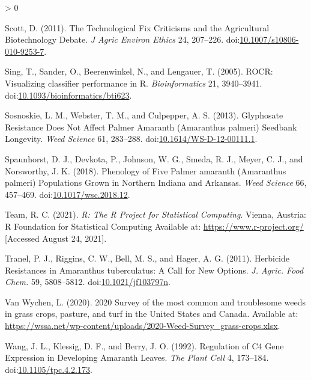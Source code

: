 \documentclass[utf8]{frontiersSCNS}
\newlength{\cslhangindent}
\newenvironment{CSLReferences}[2] %
 {%
  \setlength{\parindent}{0pt}
  \ifodd #1 \everypar{\setlength{\hangindent}{\cslhangindent}}\ignorespaces\fi
  \ifnum #2 > 0
  \setlength{\parskip}{#2\baselineskip}
  \fi
 }%
 {}
\begin{document}
\begin{CSLReferences}{1}{0}
\leavevmode\hypertarget{ref-scott2011}{}%
Scott, D. (2011). The {Technological Fix Criticisms} and the
{Agricultural Biotechnology Debate}. \emph{J Agric Environ Ethics} 24,
207--226.
doi:\href{https://doi.org/10.1007/s10806-010-9253-7}{10.1007/s10806-010-9253-7}.

\leavevmode\hypertarget{ref-sing2005}{}%
Sing, T., Sander, O., Beerenwinkel, N., and Lengauer, T. (2005). {ROCR}:
Visualizing classifier performance in {R}. \emph{Bioinformatics} 21,
3940--3941.
doi:\href{https://doi.org/10.1093/bioinformatics/bti623}{10.1093/bioinformatics/bti623}.

\leavevmode\hypertarget{ref-sosnoskie2013}{}%
Sosnoskie, L. M., Webster, T. M., and Culpepper, A. S. (2013).
Glyphosate {Resistance Does Not Affect Palmer Amaranth} ({Amaranthus}
palmeri) {Seedbank Longevity}. \emph{Weed Science} 61, 283--288.
doi:\href{https://doi.org/10.1614/WS-D-12-00111.1}{10.1614/WS-D-12-00111.1}.

\leavevmode\hypertarget{ref-spaunhorst2018}{}%
Spaunhorst, D. J., Devkota, P., Johnson, W. G., Smeda, R. J., Meyer, C.
J., and Norsworthy, J. K. (2018). Phenology of {Five Palmer} amaranth
({Amaranthus} palmeri) {Populations Grown} in {Northern Indiana} and
{Arkansas}. \emph{Weed Science} 66, 457--469.
doi:\href{https://doi.org/10.1017/wsc.2018.12}{10.1017/wsc.2018.12}.

\leavevmode\hypertarget{ref-rcoreteam2021}{}%
Team, R. C. (2021). \emph{R: {The R Project} for {Statistical
Computing}}. {Vienna, Austria}: {R Foundation for Statistical Computing}
Available at: \url{https://www.r-project.org/} {[}Accessed August 24,
2021{]}.

\leavevmode\hypertarget{ref-tranel2011}{}%
Tranel, P. J., Riggins, C. W., Bell, M. S., and Hager, A. G. (2011).
Herbicide {Resistances} in {Amaranthus} tuberculatus: {A Call} for {New
Options}. \emph{J. Agric. Food Chem.} 59, 5808--5812.
doi:\href{https://doi.org/10.1021/jf103797n}{10.1021/jf103797n}.

\leavevmode\hypertarget{ref-vanwychen2020}{}%
Van Wychen, L. (2020). 2020 {Survey} of the most common and troublesome
weeds in grass crops, pasture, and turf in the {United States} and
{Canada}. Available at:
\url{https://wssa.net/wp-content/uploads/2020-Weed-Survey_grass-crops.xlsx}.

\leavevmode\hypertarget{ref-wang1992}{}%
Wang, J. L., Klessig, D. F., and Berry, J. O. (1992). Regulation of {C4
Gene Expression} in {Developing Amaranth Leaves}. \emph{The Plant Cell}
4, 173--184.
doi:\href{https://doi.org/10.1105/tpc.4.2.173}{10.1105/tpc.4.2.173}.


\end{CSLReferences}
\end{document}
